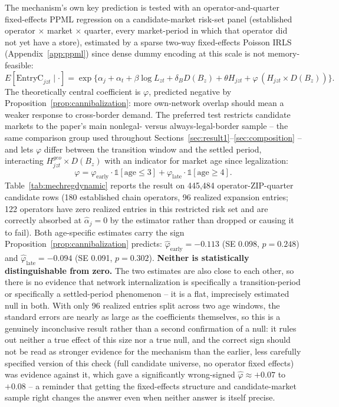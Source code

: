 \documentclass[english,12pt]{article}
\begin{document}
The mechanism's own key prediction is tested with an operator-and-quarter fixed-effects PPML regression on a candidate-market risk-set panel (established operator $\times$ market $\times$ quarter, every market-period in which that operator did not yet have a store), estimated by a sparse two-way fixed-effects Poisson IRLS (Appendix~\ref{app:ppml}) since dense dummy encoding at this scale is not memory-feasible:
\[
E[\text{EntryC}_{jzt}\mid\cdot] = \exp\{\alpha_j + \alpha_t + \beta\log L_{zt} + \delta_B D(B_z) + \theta H_{jzt} + \varphi\,(H_{jzt}\times D(B_z))\}.
\]
The theoretically central coefficient is $\varphi$, predicted negative by Proposition~\ref{prop:cannibalization}: more own-network overlap should mean a weaker response to cross-border demand. The preferred test restricts candidate markets to the paper's main nonlegal- versus always-legal-border sample -- the same comparison group used throughout Sections~\ref{sec:result1}--\ref{sec:composition} -- and lets $\varphi$ differ between the transition window and the settled period, interacting $H^{geo}_{jzt}\times D(B_z)$ with an indicator for market age since legalization:
\[
\varphi = \varphi_{\text{early}}\cdot\mathbb{1}[\text{age}\le3] + \varphi_{\text{late}}\cdot\mathbb{1}[\text{age}\ge4].
\]
Table~\ref{tab:mechregdynamic} reports the result on 445{,}484 operator-ZIP-quarter candidate rows (180 established chain operators, 96 realized expansion entries; 122 operators have zero realized entries in this restricted risk set and are correctly absorbed at $\hat\alpha_j=0$ by the estimator rather than dropped or causing it to fail). Both age-specific estimates carry the sign Proposition~\ref{prop:cannibalization} predicts: $\hat\varphi_{\text{early}}=-0.113$ (SE 0.098, $p=0.248$) and $\hat\varphi_{\text{late}}=-0.094$ (SE 0.091, $p=0.302$). \textbf{Neither is statistically distinguishable from zero.} The two estimates are also close to each other, so there is no evidence that network internalization is specifically a transition-period or specifically a settled-period phenomenon -- it is a flat, imprecisely estimated null in both. With only 96 realized entries split across two age windows, the standard errors are nearly as large as the coefficients themselves, so this is a genuinely inconclusive result rather than a second confirmation of a null: it rules out neither a true effect of this size nor a true null, and the correct sign should not be read as stronger evidence for the mechanism than the earlier, less carefully specified version of this check (full candidate universe, no operator fixed effects) was evidence against it, which gave a significantly wrong-signed $\hat\varphi\approx+0.07$ to $+0.08$ -- a reminder that getting the fixed-effects structure and candidate-market sample right changes the answer even when neither answer is itself precise.
\end{document}
